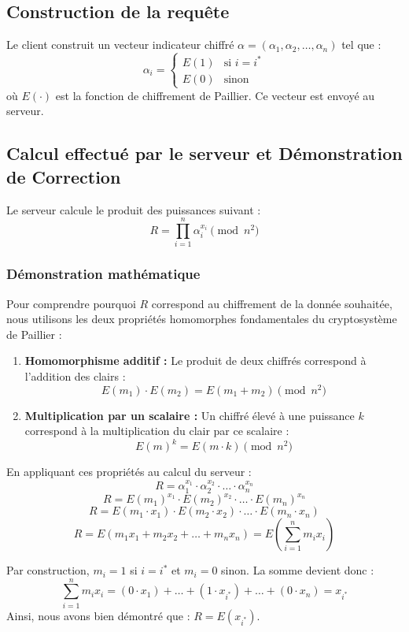 \documentclass[12pt,a4paper]{report}
\begin{document}
\subsection{Construction de la requête}
Le client construit un vecteur indicateur chiffré $\alpha = (\alpha_1, \alpha_2, \dots, \alpha_n)$ tel que :
\[
\alpha_i =
\begin{cases}
E(1) & \text{si } i = i^* \\
E(0) & \text{sinon}
\end{cases}
\]
où $E(\cdot)$ est la fonction de chiffrement de Paillier. Ce vecteur est envoyé au serveur.

\subsection{Calcul effectué par le serveur et Démonstration de Correction}
Le serveur calcule le produit des puissances suivant :
\[ R = \prod_{i=1}^{n} \alpha_i^{x_i} \pmod{n^2} \]

\subsubsection{Démonstration mathématique}
Pour comprendre pourquoi $R$ correspond au chiffrement de la donnée souhaitée, nous utilisons les deux propriétés homomorphes fondamentales du cryptosystème de Paillier :

\begin{enumerate}
    \item \textbf{Homomorphisme additif :} Le produit de deux chiffrés correspond à l'addition des clairs : 
    \[ E(m_1) \cdot E(m_2) = E(m_1 + m_2) \pmod{n^2} \]
    \item \textbf{Multiplication par un scalaire :} Un chiffré élevé à une puissance $k$ correspond à la multiplication du clair par ce scalaire : 
    \[ E(m)^k = E(m \cdot k) \pmod{n^2} \]
\end{enumerate}

En appliquant ces propriétés au calcul du serveur :
\[ R = \alpha_1^{x_1} \cdot \alpha_2^{x_2} \cdot \dots \cdot \alpha_n^{x_n} \]
\[ R = E(m_1)^{x_1} \cdot E(m_2)^{x_2} \cdot \dots \cdot E(m_n)^{x_n} \]
\[ R = E(m_1 \cdot x_1) \cdot E(m_2 \cdot x_2) \cdot \dots \cdot E(m_n \cdot x_n) \]
\[ R = E(m_1 x_1 + m_2 x_2 + \dots + m_n x_n) = E\left( \sum_{i=1}^{n} m_i x_i \right) \]

Par construction, $m_i = 1$ si $i = i^*$ et $m_i = 0$ sinon. La somme devient donc :
\[ \sum_{i=1}^{n} m_i x_i = (0 \cdot x_1) + \dots + (1 \cdot x_{i^*}) + \dots + (0 \cdot x_n) = x_{i^*} \]
Ainsi, nous avons bien démontré que : \textbf{$R = E(x_{i^*})$}.
\end{document}
